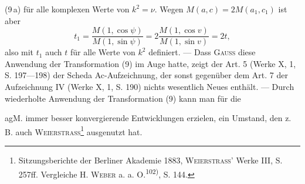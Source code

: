 (9\,a) für alle komplexen Werte von \(k^2=\nu\). Wegen \(M(a,c)=2M(a_1,c_1)\) ist
aber
\[
t_1=\frac{M(1,\cos\psi)}{M(1,\sin\psi)}=2\frac{M(1,\cos v)}{M(1,\sin v)}=2t,
\]
\noindent also mit \(t_1\) auch \(t\) für alle Werte von \(k^2\) definiert. — Dass \textsc{Gauss} diese Anwendung
der Transformation (9) im Auge hatte, zeigt der Art. 5 (Werke X, 1,
S. 197—198) der Scheda Ac-Aufzeichnung, der sonst gegenüber dem Art. 7
der Aufzeichnung IV (Werke X, 1, S. 190) nichts wesentlich Neues enthält.
— Durch wiederholte Anwendung der Transformation (9) kann man für die\par
\clearpage{}
\noindent agM. immer besser konvergierende Entwicklungen erzielen, ein Umstand, den
z. B. auch \textsc{Weierstrass}\footnote{Sitzungsberichte der Berliner Akademie 1883, \textsc{Weierstrass'} Werke III, S. 257ff. Vergleiche H. \textsc{Weber} a. a. O.\textsuperscript{102)}, S. 144.} ausgenutzt hat.
